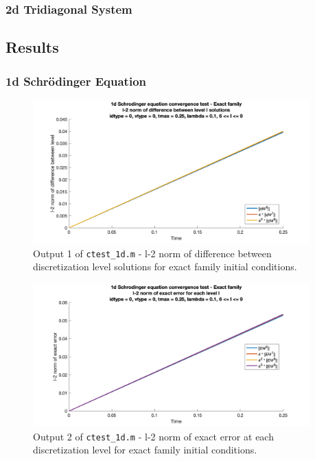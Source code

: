 \documentclass[10pt]{article}
\def\code#1{\texttt{#1}} %
\begin{document}
\subsubsection*{2d Tridiagonal System}


\subsection*{Results}

\subsubsection*{1d Schrödinger Equation}


\begin{figure}[H]
\centering
\includegraphics[width=0.95\textwidth]{problem1/ctest_1d-1.png}
\caption{Output 1 of \code{ctest\_1d.m} - 
l-2 norm of difference between discretization level solutions for exact family initial conditions.}
\end{figure}

\begin{figure}[H]
\centering
\includegraphics[width=0.95\textwidth]{problem1/ctest_1d-2.png}
\caption{Output 2 of \code{ctest\_1d.m} - 
l-2 norm of exact error at each discretization level for exact family initial conditions.}
\end{figure}
\end{document}
